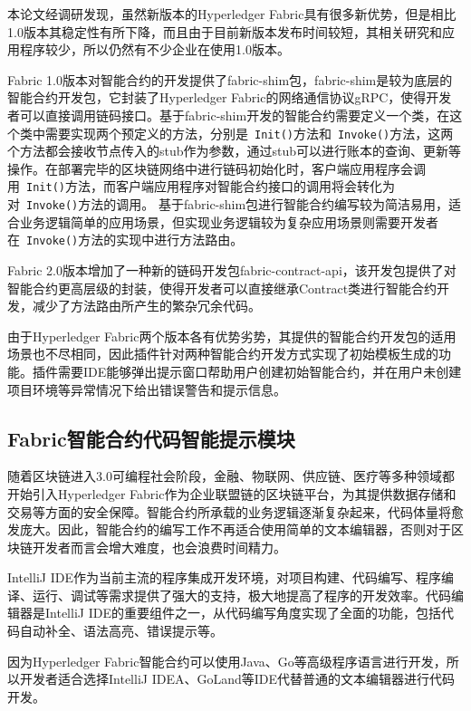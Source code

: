 本论文经调研发现，虽然新版本的Hyperledger Fabric具有很多新优势，但是相比1.0版本其稳定性有所下降，而且由于目前新版本发布时间较短，其相关研究和应用程序较少，所以仍然有不少企业在使用1.0版本。

Fabric 1.0版本对智能合约的开发提供了fabric-shim包，fabric-shim是较为底层的智能合约开发包，它封装了Hyperledger Fabric的网络通信协议gRPC，使得开发者可以直接调用链码接口。基于fabric-shim开发的智能合约需要定义一个类，在这个类中需要实现两个预定义的方法，分别是~\texttt{Init()}方法和~\texttt{Invoke()}方法，这两个方法都会接收节点传入的stub作为参数，通过stub可以进行账本的查询、更新等操作。在部署完毕的区块链网络中进行链码初始化时，客户端应用程序会调用~\texttt{Init()}方法，而客户端应用程序对智能合约接口的调用将会转化为对~\texttt{Invoke()}方法的调用。
基于fabric-shim包进行智能合约编写较为简洁易用，适合业务逻辑简单的应用场景，但实现业务逻辑较为复杂应用场景则需要开发者在~\texttt{Invoke()}方法的实现中进行方法路由。

Fabric 2.0版本增加了一种新的链码开发包fabric-contract-api，该开发包提供了对智能合约更高层级的封装，使得开发者可以直接继承Contract类进行智能合约开发，减少了方法路由所产生的繁杂冗余代码。

由于Hyperledger Fabric两个版本各有优势劣势，其提供的智能合约开发包的适用场景也不尽相同，因此插件针对两种智能合约开发方式实现了初始模板生成的功能。插件需要IDE能够弹出提示窗口帮助用户创建初始智能合约，并在用户未创建项目环境等异常情况下给出错误警告和提示信息。

\subsection{Fabric智能合约代码智能提示模块}

随着区块链进入3.0可编程社会阶段，金融、物联网、供应链、医疗等多种领域都开始引入Hyperledger Fabric作为企业联盟链的区块链平台，为其提供数据存储和交易等方面的安全保障。智能合约所承载的业务逻辑逐渐复杂起来，代码体量将愈发庞大。因此，智能合约的编写工作不再适合使用简单的文本编辑器，否则对于区块链开发者而言会增大难度，也会浪费时间精力。

IntelliJ IDE作为当前主流的程序集成开发环境，对项目构建、代码编写、程序编译、运行、调试等需求提供了强大的支持，极大地提高了程序的开发效率。代码编辑器是IntelliJ IDE的重要组件之一，从代码编写角度实现了全面的功能，包括代码自动补全、语法高亮、错误提示等。

因为Hyperledger Fabric智能合约可以使用Java、Go等高级程序语言进行开发，所以开发者适合选择IntelliJ IDEA、GoLand等IDE代替普通的文本编辑器进行代码开发。

